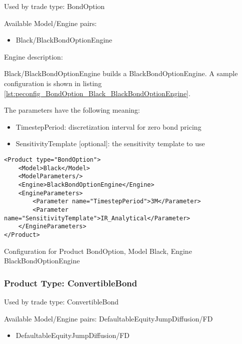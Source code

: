 Used by trade type: BondOption

Available Model/Engine pairs:

\begin{itemize}
\item Black/BlackBondOptionEngine
\end{itemize}

Engine description:

Black/BlackBondOptionEngine builds a BlackBondOptionEngine. A sample configuration is shown in listing
\ref{lst:peconfig_BondOption_Black_BlackBondOptionEngine}.

The parameters have the following meaning:

\begin{itemize}
\item TimestepPeriod: discretization interval for zero bond pricing
\item SensitivityTemplate [optional]: the sensitivity template to use 
\end{itemize}

\begin{longlisting}
\begin{verbatim}
<Product type="BondOption">
    <Model>Black</Model>
    <ModelParameters/>
    <Engine>BlackBondOptionEngine</Engine>
    <EngineParameters>
        <Parameter name="TimestepPeriod">3M</Parameter>
        <Parameter name="SensitivityTemplate">IR_Analytical</Parameter>
    </EngineParameters>
</Product>
\end{verbatim}
\caption{Configuration for Product BondOption, Model Black, Engine BlackBondOptionEngine}
\label{lst:peconfig_BondOption_Black_BlackBondOptionEngine}
\end{longlisting}

\subsubsection{Product Type: ConvertibleBond}

Used by trade type: ConvertibleBond

Available Model/Engine pairs: DefaultableEquityJumpDiffusion/FD

\begin{itemize}
\item DefaultableEquityJumpDiffusion/FD
\end{itemize}

